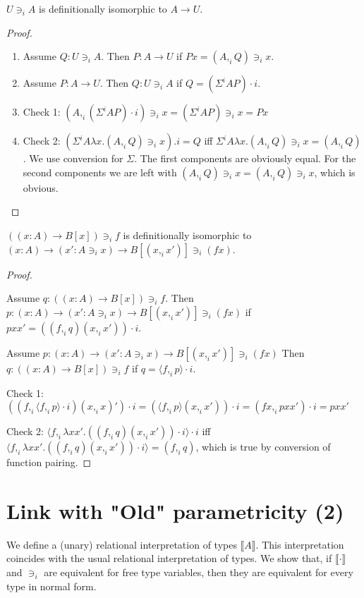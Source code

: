 \documentclass[english]{PaperTools/latex/lipics}
\newcommand\CP[3]{(#2,_{#1} #3)}
\newcommand\CSig[1]{\Sigma^{#1}}
\newcommand\param[1]{\!\cdot\!#1}
\newcommand\op[1]{∋_{#1}}
\newcommand\fp[3]{⟨#2 ,_{#1} #3⟩}
\begin{document}
\begin{theorem}
$U \op i A$ is definitionally isomorphic to $A → U$.
\end{theorem}
\begin{proof}~
  \begin{enumerate}
  \item Assume $Q : U \op i A$. Then $P : A → U$ if $P x = \CP i A Q \op i x$.
  \item Assume $P : A → U$. Then $Q : U \op i A$ if $Q = (\CSig i A P) \param i$.
  \item Check 1: $\CP i A {(\CSig i A P) \param i} \op i x = (\CSig i A P) \op i x = P x$
  \item Check 2: $(\CSig i A {λx. \CP i A Q \op i x}).i = Q$ iff $\CSig i A {λx. \CP i A Q \op i x} = \CP i A Q$. We use conversion for $\Sigma$. The first components are obviously equal. For the second components we are left with $\CP i A Q \op i x = \CP i A Q \op i x$, which is obvious.
  \end{enumerate}
\end{proof}

\begin{theorem}
$((x:A) → B[x]) \op i f$ is definitionally isomorphic to $(x:A) → (x' : A \op i x) → B[\CP i x {x'}] \op i (f x)$.
\end{theorem}
\begin{proof}~
  \item Assume $q : ((x:A) → B[x]) \op i f$. Then $p : (x:A) → (x' : A \op i x) → B[\CP i x {x'}] \op i (f x)$ if $p x x' = (\CP i f q \CP i x {x'}) \param i$.
  \item Assume $p : (x:A) → (x' : A \op i x) → B[\CP i x {x'}] \op i (f x)$ Then $q : ((x:A) → B[x]) \op i f$ if $q = \fp i f p \param i$.
  \item Check 1: $(\CP i f {\fp i f p \param i} \CP i x x') \param i = ({\fp i f p} \CP i x {x'}) \param i = \CP i {f x} {p x x'} \param i = p x x' $
  \item Check 2: $\fp i f {λx x'. (\CP i f q \CP i x {x'}) \param i} \param i$ iff $\fp i f {λx x'. (\CP i f q \CP i x {x'}) \param i} = \CP i f q$, which is true by conversion of function pairing.
\end{proof}
\section{Link with "Old" parametricity (2)}
We define a (unary) relational interpretation of types $⟦A⟧$. This
interpretation coincides with the usual relational interpretation of types.
We show that, if $⟦·⟧$ and $∋_i$ are equivalent for free type variables,
then they are equivalent for every type in normal form.
\end{document}
